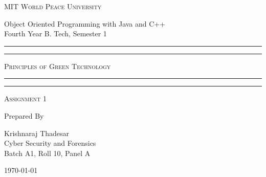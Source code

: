 \documentclass[11pt]{article}
\begin{document}
\begin{titlepage}
	\centering


	\huge\textsc{
		MIT World Peace University
	}\\

	\vspace{0.75\baselineskip} %

	\LARGE{
		Object Oriented Programming with Java and C++\\
		Fourth Year B. Tech, Semester 1
	}

	\vfill %


	\rule{\textwidth}{1.6pt}\vspace*{-\baselineskip}\vspace*{2pt}
	\rule{\textwidth}{0.6pt}
	\vspace{0.75\baselineskip} %



	\huge{\textsc{
			Principles of Green Technology
		}} \\



	\vspace{0.5\baselineskip} %
	\rule{\textwidth}{0.6pt}\vspace*{-\baselineskip}\vspace*{2.8pt}
	\rule{\textwidth}{1.6pt}

	\vspace{1\baselineskip} %


	\LARGE\textsc{
		Assignment 1
	} %
	\vfill


	Prepared By
	\vspace{0.5\baselineskip} %

	\Large{
		Krishnaraj Thadesar \\
		Cyber Security and Forensics\\
		Batch A1, Roll 10, Panel A
	}


	\vspace{0.5\baselineskip} %
	\today

\end{titlepage}
\end{document}
